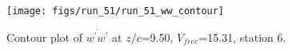 \begin{figure}[H]
\centering
\texttt{[image: figs/run\_51/run\_51\_ww\_contour]}
\caption{Contour plot of $\overline{w^\prime w^\prime}$ at $z/c$=9.50, $V_{free}$=15.31, station 6.}
\end{figure}


